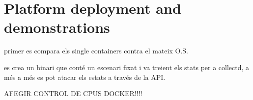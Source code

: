 \chapter{Platform deployment and demonstrations}\label{H:platformDeploymentAndDemonstrations}

primer es compara els single containers contra el mateix O.S.

es crea un binari que conté un escenari fixat i va treient els stats per a collectd, a  més a més es pot atacar els estats a través de la API.

AFEGIR CONTROL DE CPUS DOCKER!!!!

